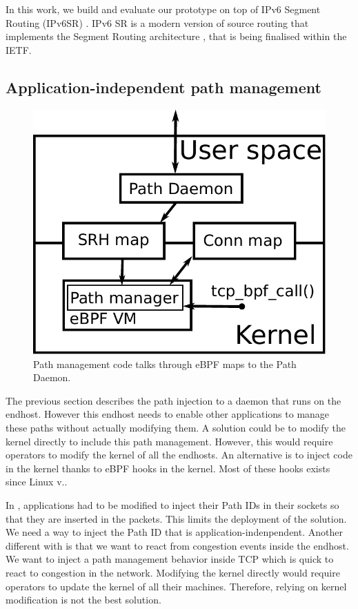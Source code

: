 In this work, we build and evaluate our prototype on top of IPv6
Segment Routing (IPv6SR) \cite{ref}. IPv6 SR is a modern version of source
routing that implements the Segment Routing architecture \cite{filsfils2015segment}, that is
being finalised within the IETF.


\subsection{Application-independent path management}

\begin{figure}
	\centering
	\includegraphics[width=0.5\columnwidth]{figs/ebpf_representation.pdf}
	\caption{Path management code talks through eBPF maps to the Path Daemon.}
	\label{fig:ebpf-representation}
\end{figure}

The previous section describes the path injection to a daemon that runs on the endhost.
However this endhost needs to enable other applications to manage these paths without actually modifying them.
A solution could be to modify the kernel directly to include this path management.
However, this would require operators to modify the kernel of all the endhosts.
An alternative is to inject code in the kernel thanks to eBPF hooks in the kernel.
Most of these hooks exists since Linux v..

In \cite{srn}, applications had to be modified to inject their Path IDs in their sockets
so that they are inserted in the packets.
This limits the deployment of the solution.
We need a way to inject the Path ID that is application-indenpendent.
Another different with \cite{srn} is that we want to react from congestion events inside the endhost.
We want to inject a path management behavior inside TCP which is quick to react to congestion in the network.
Modifying the kernel directly would require operators to update the kernel of all their machines.
Therefore, relying on kernel modification is not the best solution.

